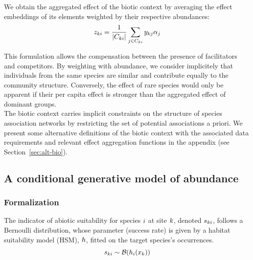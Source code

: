 \documentclass[10pt,a4paper]{article}
\begin{document}
We obtain the aggregated effect of the biotic context by averaging the effect embeddings of its elements weighted by their respective abundances:   
\begin{equation*}
z_{ki} = \frac{1}{\left\lvert C_{ki}\right\rvert} \sum_{j \in C_{ki}} y_{kj} \alpha_{j}
\end{equation*}

This formulation allows the compensation between the presence of facilitators and competitors. By weighting with abundance, we consider implicitely that individuals from the same species are similar and contribute equally to the community structure. Conversely, the effect of rare species would only be apparent if their per capita effect is stronger than the aggregated effect of dominant groups.\\

The biotic context carries implicit constraints on the structure of species association networks by restricting the set of potential associations a priori. We present some alternative definitions of the biotic context with the associated data requirements and relevant effect aggregation functions in the appendix (see Section~\ref{sec:alt-bio}). 

\subsection{A conditional generative model of abundance}

\subsubsection{Formalization}
The indicator of abiotic suitability for species $i$ at site $k$, denoted $s_{ki}$, follows a Bernoulli distribution, whose parameter (success rate) is given by a habitat suitability model (HSM), $h$, fitted on the target species's occurrences.
\begin{equation*}
    s_{ki} \sim \mathcal{B}(h_{i}(x_{k}))
\end{equation*}
\end{document}
